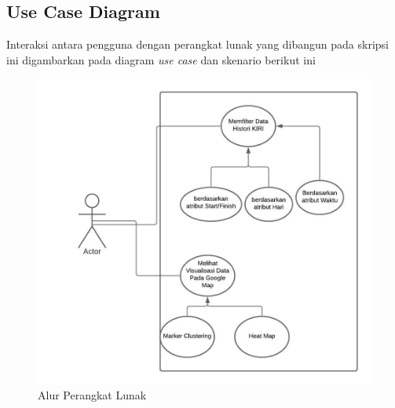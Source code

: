 \subsection{Use Case Diagram}
Interaksi antara pengguna dengan perangkat lunak yang dibangun pada skripsi ini digambarkan pada diagram \textit{use case} dan skenario berikut ini
\begin{figure}[H]
	\centering  
	\includegraphics[scale=1]{Gambar/KIRI USECASE.jpeg}  
	\caption[Alur Perangkat Lunak]{Alur Perangkat Lunak} 
	\label{fig:usecase} 
\end{figure} 
